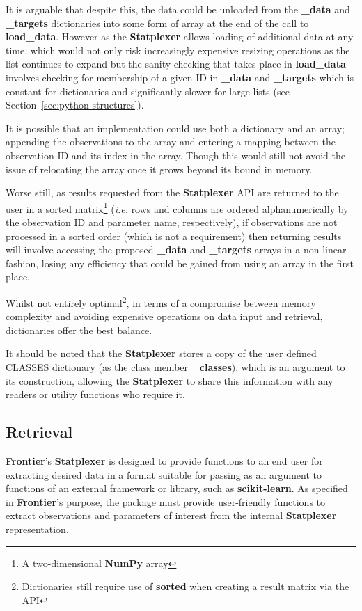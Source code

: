 It is arguable that despite this, the data could be unloaded from the
\textbf{\_data} and \textbf{\_targets} dictionaries into some form of array at
the end of the call to \textbf{load\_data}. However as the \textbf{Statplexer}
allows loading of additional data at any time, which would not only risk
increasingly expensive resizing operations as the list continues to expand but
the sanity checking that takes place in \textbf{load\_data} involves checking
for membership of a given ID in \textbf{\_data} and \textbf{\_targets} which is
constant for dictionaries and significantly slower for large lists (see
Section~\ref{sec:python-structures}).

It is possible that an implementation could use both a dictionary and an array;
appending the observations to the array and entering a mapping between the
observation ID and its index in the array.  Though this would still not avoid
the issue of relocating the array once it grows beyond its bound in memory.

Worse still, as results requested from the \textbf{Statplexer} API are returned
to the user in a sorted matrix\footnote{A two-dimensional \textbf{NumPy} array}
(\textit{i.e.} rows and columns are ordered alphanumerically by the observation
ID and parameter name, respectively), if observations are not processed in a
sorted order (which is not a requirement) then returning results will involve
accessing the proposed \textbf{\_data} and \textbf{\_targets} arrays in a
non-linear fashion, losing any efficiency that could be gained from using an
array in the first place.

Whilst not entirely optimal\footnote{Dictionaries still require use of
\textbf{sorted} when creating a result matrix via the API}, in terms of a
compromise between memory complexity and avoiding expensive operations on data
input and retrieval, dictionaries offer the best balance.

It should be noted that the \textbf{Statplexer} stores a copy of the user
defined CLASSES dictionary (as the class member \textbf{\_classes}), which is an
argument to its construction, allowing the \textbf{Statplexer} to share this
information with any readers or utility functions who require it.


\subsection{Retrieval}

\textbf{Frontier}'s \textbf{Statplexer} is designed to provide functions to an
end user for extracting desired data in a format suitable for passing as an
argument to functions of an external framework or library, such as
\textbf{scikit-learn}. As specified in \textbf{Frontier}'s purpose, the package
must provide user-friendly functions to extract observations and parameters of
interest from the internal \textbf{Statplexer} representation.

